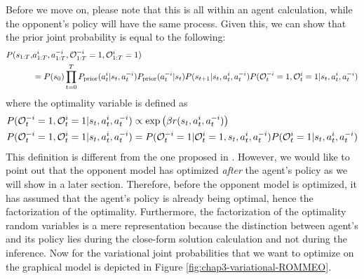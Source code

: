 Before we move on, please note that this is all within an agent calculation, while the opponent's policy will have the same process. Given this, we can show that the prior joint probability is equal to the following:
\begin{equation}
    \begin{aligned}
        P(s_{1:T}, &a^i_{1:T}, a^{-i}_{1:T}, \mathcal{O}^{-i}_{1:T} = 1, \mathcal{O}^{i}_{1:T} = 1) \\
        &= P(s_0) \prod^T_{t=0} P_{\text{prior}}(a^i_t | s_t, a^{-i}_t) P_{\text{prior}}(a^{-i}_t | s_t) P(s_{t+1} | s_t, a^i_t, a^{-i}_t) P(\mathcal{O}^{-i}_t = 1, \mathcal{O}^{i}_t = 1 | s_t, a^i_t, a^{-i}_t)
    \end{aligned}
\end{equation}
where the optimality variable is defined as 
\begin{equation}
\begin{aligned}
    &P(\mathcal{O}_t^{-i} = 1, \mathcal{O}^{i}_t = 1 | s_t, a^i_t, a^{-i}_t) \propto \exp \left(  \beta r(s_t, a^i_t, a^{-i}_t)   \right) \\
    &P(\mathcal{O}_t^{-i} = 1, \mathcal{O}^{i}_t = 1 | s_t, a^i_t, a^{-i}_t) = P(\mathcal{O}_t^{-i} = 1 |\mathcal{O}^{i}_t = 1, s_t, a^i_t, a^{-i}_t) P(\mathcal{O}^{i}_t = 1 | s_t, a^i_t, a^{-i}_t)
\end{aligned}
\end{equation}
This definition is different from the one proposed in \cite{tian2019regularized}. However, we would like to point out that the opponent model has optimized \textit{after} the agent's policy as we will show in a later section. Therefore, before the opponent model is optimized, it has assumed that the agent's policy is already being optimal, hence the factorization of the optimality. Furthermore, the factorization of the optimality random variables is a mere representation because the distinction between agent's and its policy lies during the close-form solution calculation and not during the inference. Now for the variational joint probabilities that we want to optimize on the graphical model is depicted in Figure \ref{fig:chap3-variational-ROMMEO}.
